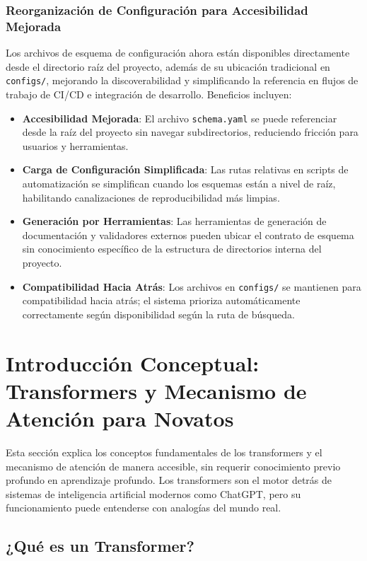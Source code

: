 \documentclass[11pt,a4paper]{article}
\begin{document}
\subsubsection{Reorganización de Configuración para Accesibilidad Mejorada}

Los archivos de esquema de configuración ahora están disponibles directamente desde el directorio raíz del proyecto, además de su ubicación tradicional en \texttt{configs/}, mejorando la discoverabilidad y simplificando la referencia en flujos de trabajo de CI/CD e integración de desarrollo. Beneficios incluyen:

\begin{itemize}[leftmargin=*]
    \item \textbf{Accesibilidad Mejorada}: El archivo \texttt{schema.yaml} se puede referenciar desde la raíz del proyecto sin navegar subdirectorios, reduciendo fricción para usuarios y herramientas.
    \item \textbf{Carga de Configuración Simplificada}: Las rutas relativas en scripts de automatización se simplifican cuando los esquemas están a nivel de raíz, habilitando canalizaciones de reproducibilidad más limpias.
    \item \textbf{Generación por Herramientas}: Las herramientas de generación de documentación y validadores externos pueden ubicar el contrato de esquema sin conocimiento específico de la estructura de directorios interna del proyecto.
    \item \textbf{Compatibilidad Hacia Atrás}: Los archivos en \texttt{configs/} se mantienen para compatibilidad hacia atrás; el sistema prioriza automáticamente correctamente según disponibilidad según la ruta de búsqueda.
\end{itemize}

\section{Introducción Conceptual: Transformers y Mecanismo de Atención para Novatos}

Esta sección explica los conceptos fundamentales de los transformers y el mecanismo de atención de manera accesible, sin requerir conocimiento previo profundo en aprendizaje profundo. Los transformers son el motor detrás de sistemas de inteligencia artificial modernos como ChatGPT, pero su funcionamiento puede entenderse con analogías del mundo real.

\subsection{¿Qué es un Transformer?}
\end{document}
